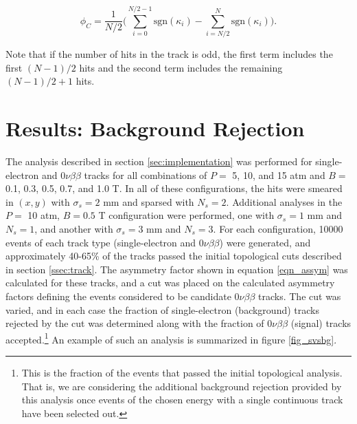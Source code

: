 \documentclass{JINST}
\begin{document}
\begin{equation}\label{eqn_assym}
\phi_{C} = \frac{1}{N/2}\Biggl(\sum_{i=0}^{N/2-1}\mathrm{sgn}(\kappa_{i}) - \sum_{i=N/2}^{N}\mathrm{sgn}(\kappa_{i})\Biggr).
\end{equation}

\noindent Note that if the number of hits in the track is odd, the first term includes the first $(N-1)/2$ hits and
the second term includes the remaining $(N-1)/2 + 1$ hits.

\section{Results: Background Rejection}
The analysis described in section \ref{sec:implementation} was performed for single-electron and
$0\nu\beta\beta$ tracks for all combinations of $P =$ 5, 10, and 15 atm and $B =$ 0.1, 0.3, 0.5, 0.7, 
and 1.0 T.  In all of these configurations, the hits were smeared in $(x,y)$ with $\sigma_{s} = 2$ mm and 
sparsed with $N_{s} = 2$.  Additional analyses in the $P =$ 10 atm, $B = 0.5$ T configuration were performed, 
one with $\sigma_{s} = 1$ mm and $N_{s} = 1$, and another with $\sigma_{s} = 3$ mm and $N_{s} = 3$.  For 
each configuration, 10000 events of each track type (single-electron and $0\nu\beta\beta$) were generated, 
and approximately 40-65\% of the tracks passed the initial topological cuts described in section 
\ref{ssec:track}.  The asymmetry factor shown in equation \ref{eqn_assym} was calculated for these tracks, and
a cut was placed on the calculated asymmetry factors defining the events considered to be candidate 
$0\nu\beta\beta$ tracks.  The cut was varied, and in each case 
the fraction of single-electron (background) tracks rejected by the cut was determined along with the fraction of 
$0\nu\beta\beta$ (signal) tracks accepted.\footnote{This is the fraction of the events that passed the initial 
topological analysis.  That is, we are considering the additional background rejection provided by this analysis  
once events of the chosen energy with a single continuous track have been selected out.}  An example of such 
an analysis is summarized in figure \ref{fig_svsbg}.
\end{document}
